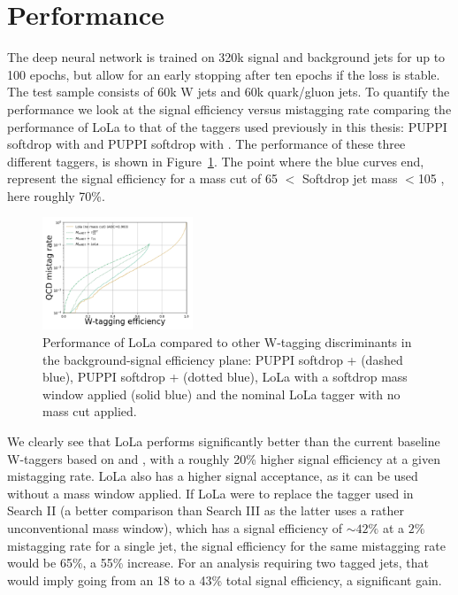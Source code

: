 \section{Performance}
The deep neural network is trained on 320k signal and background jets for up to 100 epochs, but allow for an early stopping after ten epochs if the loss is stable. The test sample consists of 60k W jets and 60k quark/gluon jets.
To quantify the performance we look at the signal efficiency versus mistagging rate comparing the performance of LoLa to that of the taggers used previously in this thesis: PUPPI softdrop with \nsubj and PUPPI softdrop with \ddt.
The performance of these three different taggers, is shown in Figure~\ref{fig:lola:roc}. The point where the blue curves end, represent the signal efficiency for a mass cut of 65 \GeV $<$ Softdrop jet mass $< $105 \GeV, here roughly 70\%.
\begin{figure}[h!]
\centering
\includegraphics[width=0.4\textwidth]{figures/vtagging/AN-18-099/training/LoLa-comp-roc.pdf}
\caption{Performance of LoLa compared to other W-tagging discriminants in the background-signal efficiency plane: PUPPI softdrop + \nsubj (dashed blue), PUPPI softdrop + \ddt (dotted blue), LoLa with a softdrop mass window applied (solid blue) and the nominal LoLa tagger with no mass cut applied.}
\label{fig:lola:roc}
\end{figure}
We clearly see that LoLa performs significantly better than the current baseline W-taggers based on \nsubj and \ddt, with a roughly 20\% higher signal efficiency at a given mistagging rate. LoLa also has a higher signal acceptance, as it can be used without a mass window applied. If LoLa were to replace the tagger used in Search II (a better comparison than Search III as the latter uses a rather unconventional mass window), which has a signal efficiency of $\sim42\%$ at a $2\%$ mistagging rate for a single jet, the signal efficiency for the same mistagging rate would be 65\%, a 55\% increase. For an analysis requiring two tagged jets, that would imply going from an 18 to a 43\% total signal efficiency, a significant gain.

